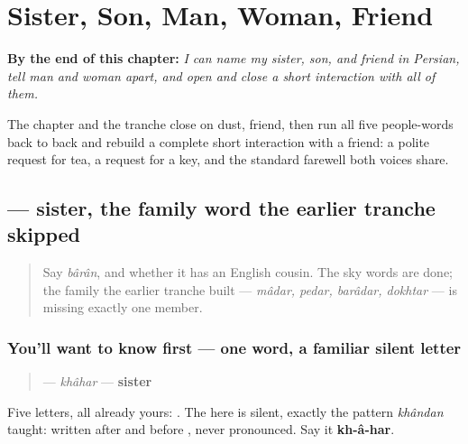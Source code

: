 
\chapter{Sister, Son, Man, Woman, Friend}
\label{ch:fa-people-words}

\begin{chapteropening}
\textbf{By the end of this chapter:} \emph{I can name my sister, son, and friend in Persian, tell man and woman apart, and open and close a short interaction with all of them.}

The chapter and the tranche close on dust, friend, then run all five people-words back to back and rebuild a complete short interaction with a friend: a polite request for tea, a request for a key, and the standard farewell both voices share.
\end{chapteropening}

\section[\texorpdfstring{\fa{خواهر} (khâhar)}{خواهر (khâhar)}]{ — sister, the family word the earlier tranche skipped}

\label{lesson:FA-C14-khahar}



\begin{quote}
Say \emph{bârân}, and whether it has an English cousin. The sky words are done; the family the earlier tranche built — \emph{mâdar, pedar, barâdar, dokhtar} — is missing exactly one member.
\end{quote}

\subsection*{You'll want to know first — one word, a familiar silent letter}
\begin{quote}
\textbf{} — \emph{khâhar} — \textbf{sister}
\end{quote}

Five letters, all already yours: \textbf{    }. The \textbf{} here is silent, exactly the pattern \emph{khândan} taught: written after \textbf{} and before \textbf{}, never pronounced. Say it \textbf{kh-â-har}.

